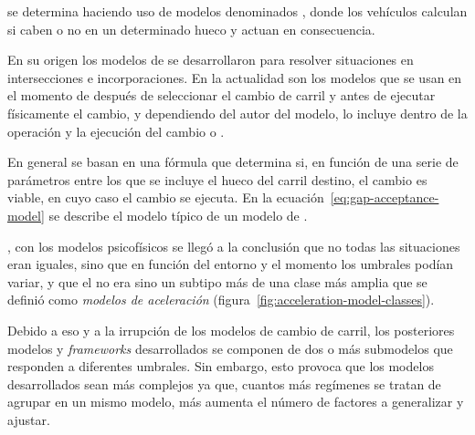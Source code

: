  se determina haciendo uso de modelos denominados \textit{}, donde los vehículos calculan si caben o no en un determinado hueco y actuan en consecuencia.

En su origen los modelos de \textit{} se desarrollaron para resolver situaciones en intersecciones e incorporaciones. En la actualidad son los modelos que se usan en el momento de después de seleccionar el cambio de carril y antes de ejecutar físicamente el cambio, y dependiendo del autor del modelo, lo incluye dentro de la operación \textit{} y la ejecución del cambio o \textbf{}.

En general se basan en una fórmula que determina si, en función de una serie de parámetros entre los que se incluye el hueco del carril destino, el cambio es viable, en cuyo caso el cambio se ejecuta. En la ecuación~\ref{eq:gap-acceptance-model} se describe el modelo típico de un modelo de . 


, con los modelos psicofísicos se llegó a la conclusión que no todas las situaciones eran iguales, sino que en función del entorno y el momento los umbrales podían variar, y que el \textit{} no era sino un subtipo más de una clase más amplia que se definió como \textit{modelos de aceleración} (figura~\ref{fig:acceleration-model-classes}).

Debido a eso y a la irrupción de los modelos de cambio de carril, los posteriores modelos y \textit{frameworks} desarrollados se componen de dos o más submodelos que responden a diferentes umbrales. Sin embargo, esto provoca que los modelos desarrollados sean más complejos ya que, cuantos más regímenes se tratan de agrupar en un mismo modelo, más aumenta el número de factores a generalizar y ajustar.

